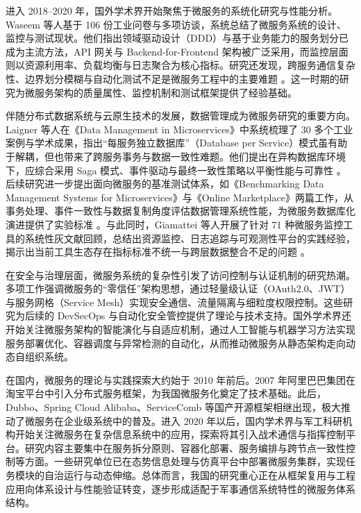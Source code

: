 进入 2018–2020 年，国外学术界开始聚焦于微服务的系统化研究与性能分析。Waseem 等人基于 106 份工业问卷与多项访谈，系统总结了微服务系统的设计、监控与测试现状。他们指出领域驱动设计（DDD）与基于业务能力的服务划分已成为主流方法，API 网关与 Backend-for-Frontend 架构被广泛采用，而监控层面则以资源利用率、负载均衡与日志聚合为核心指标。研究还发现，跨服务通信复杂性、边界划分模糊与自动化测试不足是微服务工程中的主要难题 \cite{Waseem2021Design}。这一时期的研究为微服务架构的质量属性、监控机制和测试框架提供了经验基础。

伴随分布式数据系统与云原生技术的发展，数据管理成为微服务研究的重要方向。Laigner 等人在《Data Management in Microservices》中系统梳理了 30 多个工业案例与学术成果，指出“每服务独立数据库”（Database per Service）模式虽有助于解耦，但也带来了跨服务事务与数据一致性难题。他们提出在异构数据库环境下，应综合采用 Saga 模式、事件驱动与最终一致性策略以平衡性能与可靠性 \cite{Laigner2021Data}。后续研究进一步提出面向微服务的基准测试体系，如《Benchmarking Data Management Systems for Microservices》与《Online Marketplace》两篇工作，从事务处理、事件一致性与数据复制角度评估数据管理系统性能，为微服务数据库化演进提供了实验标准 \cite{BenchmarkingDataMgmt2024,OnlineMarketplace2024}。与此同时，Giamattei 等人开展了针对 71 种微服务监控工具的系统性灰文献回顾，总结出资源监控、日志追踪与可观测性平台的实践经验，揭示出当前工具生态存在指标标准不统一与跨层数据整合不足的问题 \cite{MonitoringTools2023}。

在安全与治理层面，微服务系统的复杂性引发了访问控制与认证机制的研究热潮。多项工作强调微服务的“零信任”架构思想，通过轻量级认证（OAuth2.0、JWT）与服务网格（Service Mesh）实现安全通信、流量隔离与细粒度权限控制。这些研究为后续的 DevSecOps 与自动化安全管控提供了理论与技术支持。国外学术界还开始关注微服务架构的智能演化与自适应机制，通过人工智能与机器学习方法实现服务部署优化、容器调度与异常检测的自动化，从而推动微服务从静态架构走向动态自组织系统。

在国内，微服务的理论与实践探索大约始于 2010 年前后。2007 年阿里巴巴集团在淘宝平台中引入分布式服务框架，为我国微服务化奠定了技术基础。此后，Dubbo、Spring Cloud Alibaba、ServiceComb 等国产开源框架相继出现，极大推动了微服务在企业级系统中的普及。进入 2020 年以后，国内学术界与军工科研机构开始关注微服务在复杂信息系统中的应用，探索将其引入战术通信与指挥控制平台。研究内容主要集中在服务拆分原则、容器化部署、服务编排与跨节点一致性控制等方面。一些研究单位已在态势信息处理与仿真平台中部署微服务集群，实现任务模块的自治运行与动态伸缩。总体而言，我国的研究重心正在从框架复用与工程应用向体系设计与性能验证转变，逐步形成适配于军事通信系统特性的微服务体系结构。

